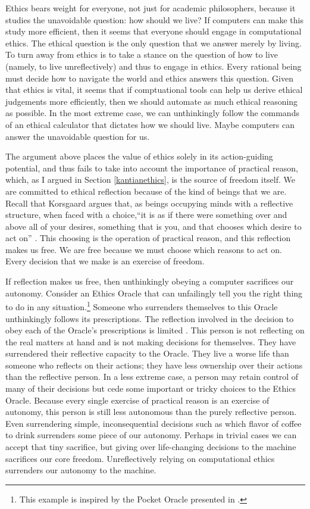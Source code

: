 \begin{isabellebody}
\begin{isamarkuptext}
Ethics bears weight for everyone, not just for academic philosophers, because it studies the unavoidable question:
how should we live? If computers can make this study more efficient, then it seems that everyone should
engage in computational ethics. The ethical question is the only question that 
we answer merely by living. To turn away from ethics is to take a stance on the question of how to 
live (namely, to live unreflectively) and thus to engage in ethics. Every rational being must decide 
how to navigate the world and ethics answers this question. Given that ethics is vital, it seems that if
comptuational tools can help us derive ethical judgements more efficiently, then we should automate as 
much ethical reasoning as possible.
In the most extreme case, we can unthinkingly follow the commands of an ethical calculator that dictates 
how we should live. Maybe computers can answer the unavoidable question for us.

The argument above places the value of ethics solely in its action-guiding potential, and thus fails to take into account the 
importance of practical reason, which, as I argued in Section \ref{kantianethics}, is the source
of freedom itself. We are committed to ethical reflection because of the kind of beings that we are. 
Recall that Korsgaard argues that, as beings occupying minds with a reflective structure, when faced with 
a choice,``it is as if there were something over and above all of your desires, something that is you, and that chooses which desire 
to act on'' \citep[83]{sources}. This choosing is the operation of practical reason, and this reflection
makes us free. We are free because we must choose which reasons to act on. Every decision that we 
make is an exercise of freedom. 

If reflection makes us free, then unthinkingly obeying a computer sacrifices our autonomy. Consider 
an Ethics Oracle that can unfailingly tell you the right thing to do in any 
situation.\footnote{This example is inspired by the Pocket Oracle presented in \citet{bok}.} Someone 
who surrenders themselves to this Oracle unthinkingly follows its prescriptions. 
The reflection involved in the decision to obey each of the Oracle’s prescriptions is limited \citep{bok}. 
This person is not reflecting on the real matters at hand and is 
not making decisions for themselves. They have surrendered their reflective capacity to the Oracle. 
They live a worse life than someone who reflects on their actions; they have less ownership over their 
actions than the reflective person. In a less extreme case, a person may retain control of many of 
their decisions but cede some important or tricky choices to the Ethics Oracle. Because every single 
exercise of practical reason is an exercise of autonomy, this person is still less autonomous than the 
purely reflective person. Even surrendering simple, inconsequential decisions such as which flavor of 
coffee to drink surrenders some piece of our autonomy. Perhaps in trivial cases we can accept that 
tiny sacrifice, but giving over life-changing decisions to the machine sacrifices our 
core freedom. Unreflectively relying on computational ethics surrenders our autonomy to the machine. 


\end{isamarkuptext}
\end{isabellebody}
